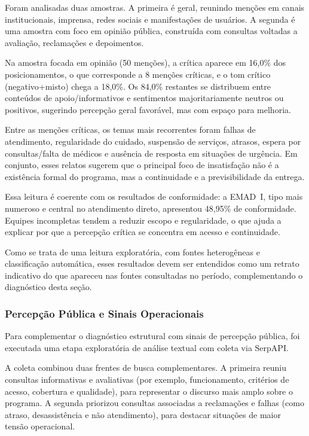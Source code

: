 \documentclass[12pt]{article}
\begin{document}
Foram analisadas duas amostras. A primeira é geral, reunindo menções em canais institucionais, imprensa, redes sociais e manifestações de usuários. A segunda é uma amostra com foco em opinião pública, construída com consultas voltadas a avaliação, reclamações e depoimentos.

Na amostra focada em opinião (50 menções), a crítica aparece em 16,0\% dos posicionamentos, o que corresponde a 8 menções críticas, e o tom crítico (negativo+misto) chega a 18,0\%. Os 84,0\% restantes se distribuem entre conteúdos de apoio/informativos e sentimentos majoritariamente neutros ou positivos, sugerindo percepção geral favorável, mas com espaço para melhoria.

Entre as menções críticas, os temas mais recorrentes foram falhas de atendimento, regularidade do cuidado, suspensão de serviços, atrasos, espera por consultas/falta de médicos e ausência de resposta em situações de urgência. Em conjunto, esses relatos sugerem que o principal foco de insatisfação não é a existência formal do programa, mas a continuidade e a previsibilidade da entrega.

Essa leitura é coerente com os resultados de conformidade: a EMAD~I, tipo mais numeroso e central no atendimento direto, apresentou 48,95\% de conformidade. Equipes incompletas tendem a reduzir escopo e regularidade, o que ajuda a explicar por que a percepção crítica se concentra em acesso e continuidade.

Como se trata de uma leitura exploratória, com fontes heterogêneas e classificação automática, esses resultados devem ser entendidos como um retrato indicativo do que apareceu nas fontes consultadas no período, complementando o diagnóstico desta seção.
\fi

\subsubsection{Percepção Pública e Sinais Operacionais}

Para complementar o diagnóstico estrutural com sinais de percepção pública, foi executada uma etapa exploratória de análise textual com coleta via SerpAPI.

A coleta combinou duas frentes de busca complementares. A primeira reuniu consultas informativas e avaliativas (por exemplo, funcionamento, critérios de acesso, cobertura e qualidade), para representar o discurso mais amplo sobre o programa. A segunda priorizou consultas associadas a reclamações e falhas (como atraso, desassistência e não atendimento), para destacar situações de maior tensão operacional.
\end{document}
